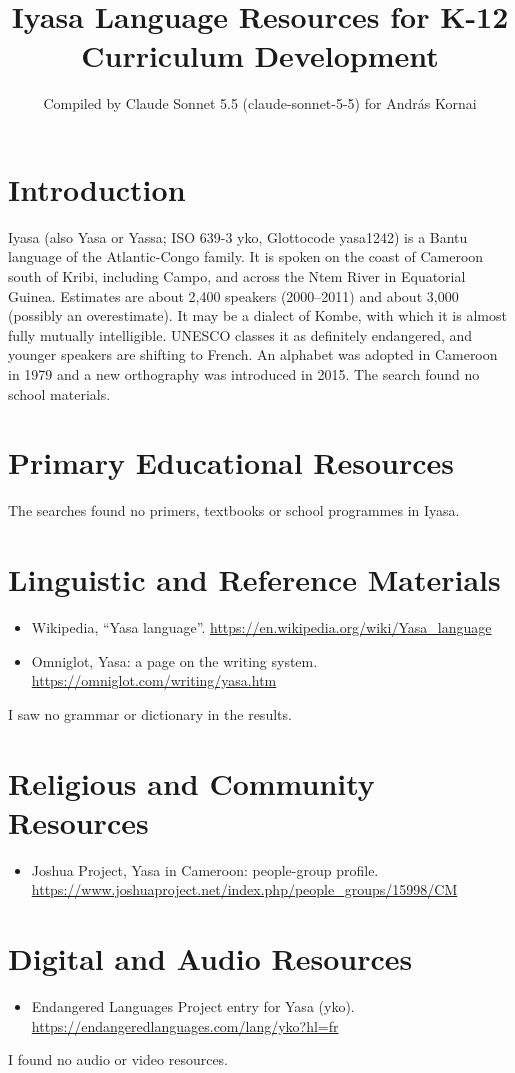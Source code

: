 \documentclass[12pt]{article}
\title{Iyasa Language Resources for K-12 Curriculum Development}
\author{Compiled by Claude Sonnet 5.5 (claude-sonnet-5-5) for Andr\'as Kornai}
\date{}
\begin{document}
\maketitle

\section{Introduction}
Iyasa (also Yasa or Yassa; ISO 639-3 yko, Glottocode yasa1242) is a Bantu language of the Atlantic-Congo family. It is spoken on the coast of Cameroon south of Kribi, including Campo, and across the Ntem River in Equatorial Guinea. Estimates are about 2,400 speakers (2000--2011) and about 3,000 (possibly an overestimate). It may be a dialect of Kombe, with which it is almost fully mutually intelligible. UNESCO classes it as definitely endangered, and younger speakers are shifting to French. An alphabet was adopted in Cameroon in 1979 and a new orthography was introduced in 2015. The search found no school materials.

\section{Primary Educational Resources}
The searches found no primers, textbooks or school programmes in Iyasa.

\section{Linguistic and Reference Materials}
\begin{itemize}
\item Wikipedia, ``Yasa language''. \url{https://en.wikipedia.org/wiki/Yasa_language}
\item Omniglot, Yasa: a page on the writing system. \url{https://omniglot.com/writing/yasa.htm}
\end{itemize}
I saw no grammar or dictionary in the results.

\section{Religious and Community Resources}
\begin{itemize}
\item Joshua Project, Yasa in Cameroon: people-group profile. \url{https://www.joshuaproject.net/index.php/people_groups/15998/CM}
\end{itemize}

\section{Digital and Audio Resources}
\begin{itemize}
\item Endangered Languages Project entry for Yasa (yko). \url{https://endangeredlanguages.com/lang/yko?hl=fr}
\end{itemize}
I found no audio or video resources.
\end{document}
